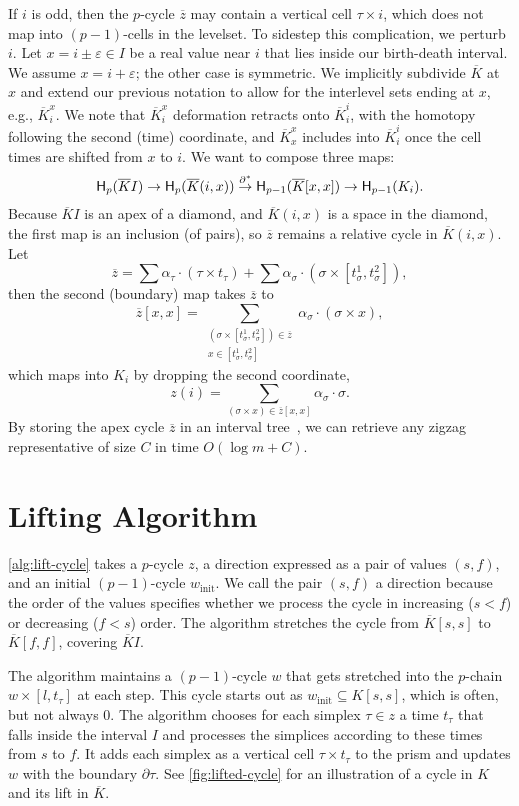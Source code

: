 \documentclass[cleveref,a4paper,english,nolineno]{socg-lipics-v2021}
\newcommand{\Hgr}{{\sf H}}
\newcommand{\prism}[1]{\overline{#1}}
\newcommand{\bdry}{\partial}
\newcommand{\pK}{\prism{K}}
\newcommand{\pz}{\prism{z}}
\newcommand{\ssx}{\sigma}
\newcommand{\tsx}{\tau}
\newcommand{\winit}{w_\textrm{init}}
\newcommand{\ee}{\varepsilon}
\begin{document}
If $i$ is odd, then the $p$-cycle $\pz$ may contain a vertical cell $\tsx \times
i$, which does not map into $(p-1)$-cells in the levelset. To sidestep this
complication, we perturb $i$.
Let $x = i
\pm \ee \in I$ be a real value near $i$ that lies inside our birth-death
interval. We assume $x = i + \ee$; the other case is symmetric.
We implicitly subdivide $\pK$ at $x$ and extend our previous notation to allow
for the interlevel sets ending at $x$, e.g., $\pK_i^x$.
We note that $\pK_i^x$ deformation retracts onto $\pK_i^i$, with the homotopy
following the second (time) coordinate, and $\pK_x^x$ includes into $\pK_i^i$
once the cell times are shifted from $x$ to $i$.
We want to compose three maps:
\[
    \Hgr_p(\pK I) \to \Hgr_p(\pK(i,x)) \stackrel{\bdry^*}{\to} \Hgr_{p-1}(\pK[x,x]) \to \Hgr_{p-1}(K_i).
\]
Because $\pK I$ is an apex of a diamond, and $\pK(i,x)$ is a space in the diamond, the first map is an inclusion (of pairs), so $\pz$ remains a relative cycle in $\pK(i,x)$.
Let
\[
    \pz = \sum \alpha_\tsx \cdot (\tsx \times t_\tsx) + \sum \alpha_\ssx \cdot (\ssx \times [t_\ssx^1,t_\ssx^2]),
\]
then the second (boundary) map takes $\pz$ to
\[
    \pz[x,x] = \sum_{\substack{(\ssx \times [t_\ssx^1,t_\ssx^2]) \in \pz \\ x \in [t_\ssx^1,t_\ssx^2]}} \alpha_\ssx \cdot (\ssx \times x),
\]
which maps into $K_i$ by dropping the second coordinate,
\[
    z(i) = \sum_{(\ssx \times x) \in \pz[x,x]} \alpha_\ssx \cdot \ssx.
\]
By storing the apex cycle $\pz$ in an interval tree~\cite{Ede80,McC80}, we can
retrieve any zigzag representative of size $C$ in time $O(\log m + C)$.





\appendix

\section{Lifting Algorithm}
\label{apx:lifting}

\cref{alg:lift-cycle} takes a $p$-cycle $z$, a direction expressed as a pair of
values $(s,f)$, and an initial $(p-1)$-cycle $\winit$.
We call the pair $(s,f)$ a direction because the order of the values specifies
whether we process the cycle in increasing ($s < f$) or decreasing ($f < s$)
order. The algorithm stretches the cycle from $\pK[s,s]$ to $\pK[f,f]$,
covering $\pK I$.

The algorithm maintains a $(p-1)$-cycle $w$ that gets stretched into the $p$-chain
$w \times [l,t_\tsx]$ at each step.
This cycle starts out as
$\winit \subseteq K[s,s]$, which is often, but not always 0.
The algorithm chooses for each simplex $\tsx \in z$ a time $t_\tsx$ that falls
inside the interval $I$ and processes the simplices according to these times
from $s$ to $f$. It adds each simplex as a vertical cell $\tsx \times t_\tsx$ to
the prism and updates $w$ with the boundary $\bdry \tsx$.
See \cref{fig:lifted-cycle} for an illustration of a cycle in $K$ and its lift
in $\pK$.
\end{document}
